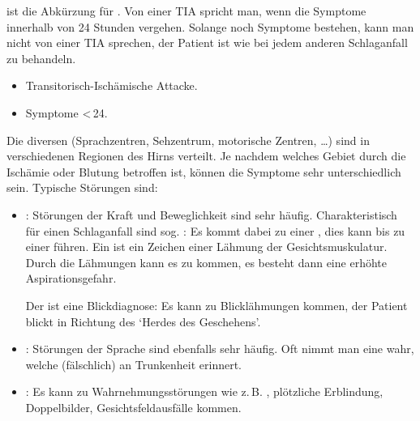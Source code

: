 
{%
\label{topic:tia}
 ist die Abkürzung für .
Von einer TIA spricht man, wenn die Symptome  innerhalb von
24 Stunden vergehen. Solange noch Symptome bestehen, kann
man nicht von einer TIA sprechen, der Patient ist wie bei
jedem anderen Schlaganfall zu behandeln.
\bigskip
}
{
\begin{itemize}
  \item Transitorisch-Ischämische Attacke.
  \item Symptome <\,24\Hour*.
\end{itemize}

}{}{}{}


\TextSlide{\TxSymptome}
{%
Die diversen 
(Sprachzentren, Sehzentrum, motorische Zentren, \ldots)
sind in verschiedenen Regionen des Hirns verteilt. Je
nachdem welches Gebiet durch die Ischämie oder Blutung
betroffen ist, können die Symptome sehr unterschiedlich
sein.  Typische Störungen sind:

\begin{itemize}
  \item {}: Störungen der Kraft und Beweglichkeit
  sind sehr häufig.
  Charakteristisch für einen
  Schlaganfall sind sog. : Es kommt
  dabei zu einer , dies kann
  bis zu einer  führen. Ein
   ist ein Zeichen einer
  Lähmung der
  Gesichtsmuskulatur. Durch die Lähmungen kann es zu
   kommen, es besteht dann eine erhöhte
  Aspirationsgefahr.
  
  Der  ist eine Blickdiagnose: Es kann zu
  Blicklähmungen kommen, der Patient blickt in Richtung des
  \enquote*{Herdes des Geschehens}.
  
  \item {}: Störungen der Sprache sind ebenfalls
  sehr häufig. Oft nimmt man eine 
  wahr, welche (fälschlich) an Trunkenheit erinnert.
  
  \item {}:
  Es kann zu Wahrnehmungsstörungen wie z.\,B.
  , plötzliche Erblindung, Doppelbilder,
  Gesichtsfeldausfälle kommen.
  

\end{itemize}}
